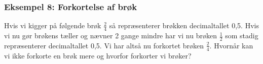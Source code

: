 \subsubsection*{Eksempel 8: Forkortelse af brøk}

 Hvis vi kigger på følgende brøk $\frac{2}{4}$ så repræsenterer brøkken decimaltallet 0,5. Hvis vi nu gør brøkens tæller og nævner 2 gange mindre har vi nu brøken $\frac{1}{2}$ som stadig repræsenterer decimaltallet 0,5. Vi har altså nu forkortet brøken $\frac{2}{4}$. Hvornår kan vi ikke forkorte en brøk mere og hvorfor forkorter vi brøker?